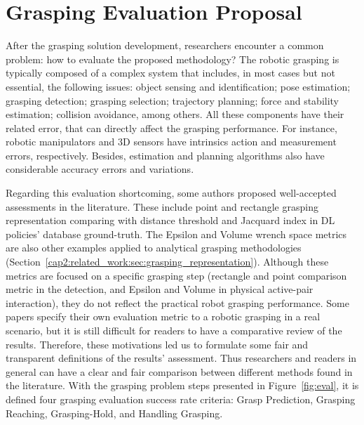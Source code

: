 

\chapter{Grasping Evaluation Proposal}
\label{cap3:grasping_eval}

After the grasping solution development, researchers encounter a common problem: how to evaluate the proposed methodology? The robotic grasping is typically composed of a complex system that includes, in most cases but not essential, the following issues: object sensing and identification; pose estimation; grasping detection; grasping selection; trajectory planning; force and stability estimation; collision avoidance, among others. All these components have their related error, that can directly affect the grasping performance. For instance, robotic manipulators and 3D sensors have intrinsics action and measurement errors, respectively. Besides, estimation and planning algorithms also have considerable accuracy errors and variations.

Regarding this evaluation shortcoming, some authors proposed well-accepted assessments in the literature. These include point and rectangle grasping representation comparing with distance threshold and Jacquard index in \ac{DL} policies' database ground-truth. The Epsilon and Volume wrench space metrics are also other examples applied to analytical grasping methodologies (Section~\ref{cap2:related_work:sec:grasping_representation}). Although these metrics are focused on a specific grasping step (rectangle and point comparison metric in the detection, and Epsilon and Volume in physical active-pair interaction), they do not reflect the practical robot grasping performance. Some papers specify their own evaluation metric to a robotic grasping in a real scenario, but it is still difficult for readers to have a comparative review of the results. Therefore, these motivations led us to formulate some fair and transparent definitions of the results' assessment. Thus researchers and readers in general can have a clear and fair comparison between different methods found in the literature. With the grasping problem steps presented in Figure~\ref{fig:eval}, it is defined four grasping evaluation success rate criteria: Grasp Prediction, Grasping Reaching, Grasping-Hold, and Handling Grasping.


